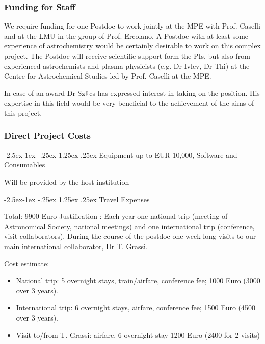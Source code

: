 \documentclass[10pt,fleqn,twoside]{article}
\makeatletter
\newcommand{\Tcol}{\color{blue}}
\renewcommand\paragraph{\@startsection{paragraph}{4}{\z@}%
            {-2.5ex\@plus -1ex \@minus -.25ex}%
            {1.25ex \@plus .25ex}%
            {\normalfont\normalsize\bfseries}}
\makeatother
\begin{document}
\subsubsection{\Tcol Funding for Staff}
We require funding for one Postdoc to work jointly at the MPE with Prof. Caselli and at the LMU in the group of
Prof. Ercolano.
A Postdoc with at least some experience of astrochemistry would be certainly desirable  to work on this complex  project. The Postdoc will receive scientific support form the PIs, but also from experienced astrochemists and plasma physicists (e.g. Dr Ivlev, Dr Thi) at the Centre for Astrochemical Studies led by Prof. Caselli at the MPE. 

In case of an award Dr Sz$\ddot{\textsf u}$cs has expressed interest in taking on the position. His expertise in this field would be very beneficial to the achievement of the aims of this project.

\subsubsection{\Tcol Direct Project Costs}


\paragraph{\Tcol Equipment up to EUR 10,000, Software and Consumables}

Will be provided by the host institution

\paragraph{\Tcol Travel Expenses}

Total: 9900 Euro Justification : Each year one national trip (meeting of Astronomical Society, national
meetings) and one international trip (conference, visit
collaborators). 
During the course of the postdoc one week long visits to our main
international collaborator, Dr T. Grassi. 

Cost estimate: 
\begin{itemize}
\item National trip: 5 overnight stays, train/airfare,
conference fee; 1000 Euro (3000 over 3 years).
\item International trip: 6 overnight stays, airfare, conference fee;
  1500 Euro (4500 over 3 years).
\item Visit to/from T. Grassi: airfare, 6 overnight stay 1200 Euro (2400
  for 2 visits)
\end{itemize}
\end{document}
